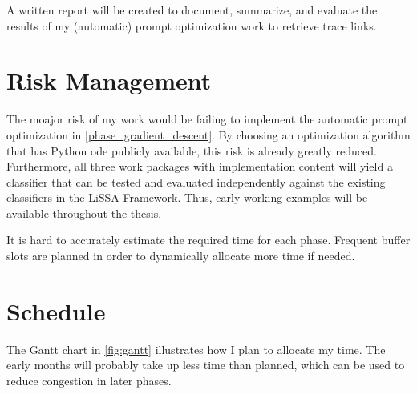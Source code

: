 A written report will be created to document, summarize, and evaluate the results of my (automatic) prompt optimization work to retrieve trace links.


\section{Risk Management}
\label{sec:work_risks}
The moajor risk of my work would be failing to implement the automatic prompt optimization in \ref{phase_gradient_descent}. By choosing an optimization algorithm that has Python ode publicly available, this risk is already greatly reduced. Furthermore, all three work packages with implementation content will yield a classifier that can be tested and evaluated independently against the existing classifiers in the LiSSA Framework. Thus, early working examples will be available throughout the thesis. 

It is hard to accurately estimate the required time for each phase. Frequent buffer slots are planned in order to dynamically allocate more time if needed.




\section{Schedule}
\label{sec:work_gant}
The Gantt chart in \autoref{fig:gantt} illustrates how I plan to allocate my time. The early months will probably take up less time than planned, which can be used to reduce congestion in later phases.


